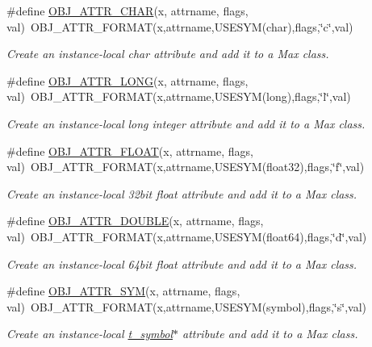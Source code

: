 \begin{DoxyCompactItemize}
\#define \hyperlink{group__attr_gabea8a22ac97106d528dfab8e2245a5dd}{OBJ\_\-ATTR\_\-CHAR}(x, attrname, flags, val)~OBJ\_\-ATTR\_\-FORMAT(x,attrname,USESYM(char),flags,\char`\"{}c\char`\"{},val)
\begin{DoxyCompactList}\small\item\em Create an instance-\/local char attribute and add it to a Max class. \item\end{DoxyCompactList}\item 
\#define \hyperlink{group__attr_gaf4efa843da34f7db4575ab1d8f3a21c5}{OBJ\_\-ATTR\_\-LONG}(x, attrname, flags, val)~OBJ\_\-ATTR\_\-FORMAT(x,attrname,USESYM(long),flags,\char`\"{}l\char`\"{},val)
\begin{DoxyCompactList}\small\item\em Create an instance-\/local long integer attribute and add it to a Max class. \item\end{DoxyCompactList}\item 
\#define \hyperlink{group__attr_gab84f72b59c20bf72160482005359dd86}{OBJ\_\-ATTR\_\-FLOAT}(x, attrname, flags, val)~OBJ\_\-ATTR\_\-FORMAT(x,attrname,USESYM(float32),flags,\char`\"{}f\char`\"{},val)
\begin{DoxyCompactList}\small\item\em Create an instance-\/local 32bit float attribute and add it to a Max class. \item\end{DoxyCompactList}\item 
\#define \hyperlink{group__attr_ga6a6922fb50714f467415ec838e9509c8}{OBJ\_\-ATTR\_\-DOUBLE}(x, attrname, flags, val)~OBJ\_\-ATTR\_\-FORMAT(x,attrname,USESYM(float64),flags,\char`\"{}d\char`\"{},val)
\begin{DoxyCompactList}\small\item\em Create an instance-\/local 64bit float attribute and add it to a Max class. \item\end{DoxyCompactList}\item 
\#define \hyperlink{group__attr_ga1f650601b65a6faa39ad53f6faa52e0e}{OBJ\_\-ATTR\_\-SYM}(x, attrname, flags, val)~OBJ\_\-ATTR\_\-FORMAT(x,attrname,USESYM(symbol),flags,\char`\"{}s\char`\"{},val)
\begin{DoxyCompactList}\small\item\em Create an instance-\/local \hyperlink{structt__symbol}{t\_\-symbol}$\ast$ attribute and add it to a Max class. \item\end{DoxyCompactList}\item 

\end{DoxyCompactItemize}
